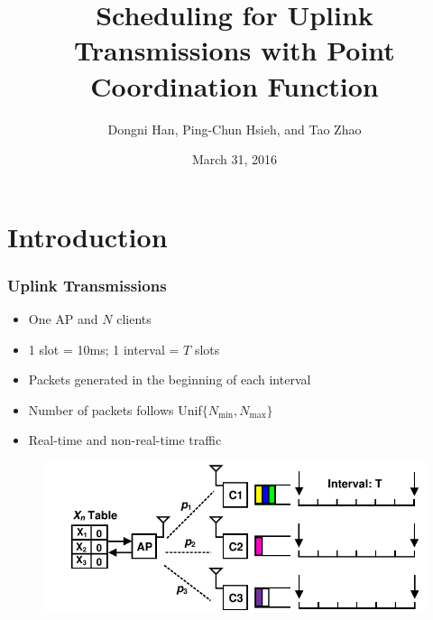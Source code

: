 \documentclass{beamer}
\begin{document}
\title{Scheduling for Uplink Transmissions with Point Coordination Function}
\author{Dongni Han, Ping-Chun Hsieh, and Tao Zhao}
\date{March 31, 2016}
\newtheorem{thm}{Theorem} 
\begin{frame}
\titlepage
\end{frame}





\section{Introduction}

\begin{frame}
\frametitle{Uplink Transmissions}
\begin{itemize}
\item One AP and $N$ clients
\item 1 slot = 10ms; 1 interval = $T$ slots
\item Packets generated in the beginning of each interval
\item Number of packets follows Unif$\{N_\text{min}, N_\text{max}\}$
\item Real-time and non-real-time traffic
\end{itemize}
\begin{figure}
\centering
\includegraphics[scale=0.8]{network.pdf}
\end{figure}
\end{frame}
\end{document}
